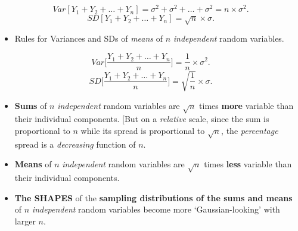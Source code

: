\documentclass[
]{article}
\providecommand{\tightlist}{%
  \setlength{\itemsep}{0pt}\setlength{\parskip}{0pt}}
\begin{document}
\[ Var[ Y_1 + Y_2 + \dots + Y_n] = \sigma^2 + \sigma^2 + \dots + \sigma^2 = n \times \sigma^2.\]
\[ SD[ Y_1 + Y_2 + \dots + Y_n]  = \sqrt{n} \times \sigma.\]

\begin{itemize}
\tightlist
\item
  Rules for Variances and SDs of \emph{means} of \(n\)
  \emph{independent} random variables.
\end{itemize}

\[ Var\bigg[\frac{Y_1 + Y_2 + \dots + Y_n}{n}\bigg] =  \frac{1}{n} \times \sigma^2.\]
\[ SD\bigg[\frac{Y_1 + Y_2 + \dots + Y_n}{n}\bigg] =  \sqrt{\frac{1}{n}} \times \sigma.\]

\begin{itemize}
\item
  \textbf{Sums} of \(n\) \emph{independent} random variables are
  \(\sqrt{n}\) times \textbf{more} variable than their individual
  components. {[}But on a \emph{relative} scale, since the sum is
  proportional to \(n\) while its spread is proportional to
  \(\sqrt{n}\), the \emph{percentage} spread is a \emph{decreasing}
  function of \(n.\)
\item
  \textbf{Means} of \(n\) \emph{independent} random variables are
  \(\sqrt{n}\) times \textbf{less} variable than their individual
  components.
\item
  \textbf{The SHAPES} of the \textbf{sampling distributions of the sums
  and means} of \(n\) \emph{independent} random variables become more
  `Gaussian-looking' with larger \(n.\)
\end{itemize}
\end{document}
